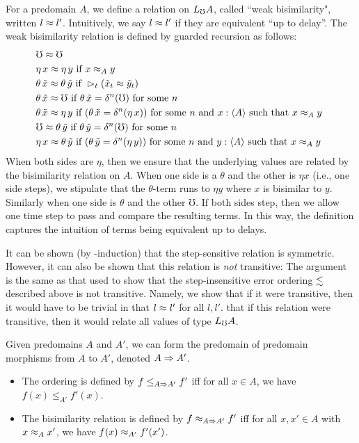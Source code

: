 For a predomain $A$, we define a relation on $L_\mho A$, called ``weak bisimilarity",
written $l \approx l'$. Intuitively, we say $l \approx l'$ if they are equivalent ``up to delay''.
The weak bisimilarity relation is defined by guarded recursion as follows:
%
\begin{align*}
  &\mho \bisim \mho \\
%
  &\eta\, x \bisim \eta\, y \text{ if } 
    x \bisim_A y \\
%		
  &\theta\, \tilde{x} \bisim \theta\, \tilde{y} \text{ if } 
    \later_t (\tilde{x}_t \bisim \tilde{y}_t) \\
%	
  &\theta\, \tilde{x} \bisim \mho \text{ if } 
    \theta\, \tilde{x} = \delta^n(\mho) \text { for some $n$ } \\
%	
  &\theta\, \tilde{x} \bisim \eta\, y \text{ if }
    (\theta\, \tilde{x} = \delta^n(\eta\, x))
  \text { for some $n$ and $x : \ty{A}$ such that $x \bisim_A y$ } \\
%
  &\mho \bisim \theta\, \tilde{y} \text { if } 
    \theta\, \tilde{y} = \delta^n(\mho) \text { for some $n$ } \\
%	
  &\eta\, x \bisim \theta\, \tilde{y} \text { if }
    (\theta\, \tilde{y} = \delta^n (\eta\, y))
  \text { for some $n$ and $y : \ty{A}$ such that $x \bisim_A y$ }
\end{align*}
%
When both sides are $\eta$, then we ensure that the underlying values are related
by the bisimilarity relation on $A$.
When one side is a $\theta$ and the other is $\eta x$ (i.e., one side steps),
we stipulate that the $\theta$-term runs to $\eta y$ where $x$ is bisimilar to $y$.
Similarly when one side is $\theta$ and the other $\mho$.
If both sides step, then we allow one time step to pass and compare the resulting terms.
In this way, the definition captures the intuition of terms being equivalent up to
delays.

It can be shown (by \lob-induction) that the step-sensitive relation is symmetric.
However, it can also be shown that this relation is \emph{not} transitive:
The argument is the same as that used to show that the step-insensitive error
ordering $\lesssim$ described above is not transitive. Namely, we show that
if it were transitive, then it would have to be trivial in that $l \approx l'$ for all $l, l'$.
that if this relation were transitive, then it would relate all values of type $L_\mho A$.


Given predomains $A$ and $A'$, we can form the predomain of
predomain morphisms from $A$ to $A'$, denoted $A \Rightarrow A'$.
\begin{itemize}
    \item The ordering is defined by $f \le_{A \Rightarrow A'} f'$ iff for all
    $x \in A$, we have $f(x) \le_{A'} f'(x)$.
    \item The bisimilarity relation is defined by $f \approx_{A \Rightarrow A'} f'$ iff
    for all $x, x' \in A$ with $x \approx_{A} x'$, we have $f(x) \approx_{A'} f'(x')$. 
\end{itemize}

